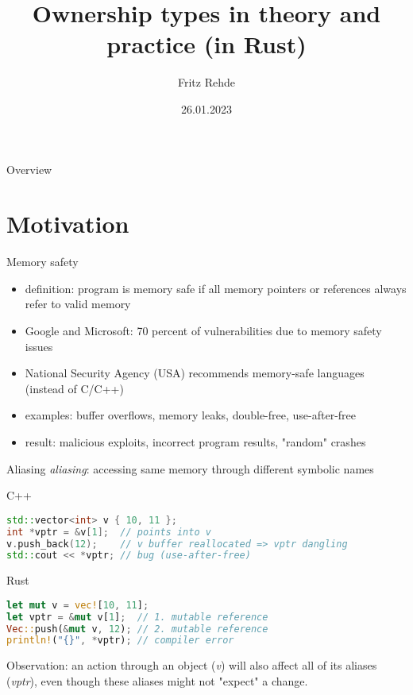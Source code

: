 \documentclass[handout]{beamer}
\title{Ownership types in theory and practice (in Rust)}
\author{Fritz Rehde}
\institute{School of Computation, Information, and Technology\\Technical University of Munich}
\date{26.01.2023}
\begin{document}
\frame{\titlepage}

\begin{frame}{Overview}
\tableofcontents
\end{frame}

\section{Motivation}

\begin{frame}{Memory safety}
\begin{itemize}
  \item definition: program is memory safe if all memory pointers or references always refer to valid memory
  \item Google and Microsoft: 70 percent of vulnerabilities due to memory safety issues
  \item National Security Agency (USA) recommends memory-safe languages (instead of C/C++)
  \item examples: buffer overflows, memory leaks, double-free, use-after-free
  \item result: malicious exploits, incorrect program results, "random" crashes
\end{itemize}
\end{frame}




\begin{frame}[fragile]{Aliasing}
\emph{aliasing}: accessing same memory through different symbolic names
\pause

C++
\begin{lstlisting}[language=C++]
std::vector<int> v { 10, 11 };
int *vptr = &v[1];  // points into v
v.push_back(12);    // v buffer reallocated => vptr dangling
std::cout << *vptr; // bug (use-after-free)
\end{lstlisting}
\pause


Rust
\begin{lstlisting}[language=Rust]
let mut v = vec![10, 11];
let vptr = &mut v[1];  // 1. mutable reference
Vec::push(&mut v, 12); // 2. mutable reference
println!("{}", *vptr); // compiler error
\end{lstlisting}

Observation: an action through an object (\emph{v}) will also affect all of its aliases (\emph{vptr}), even though these aliases might not "expect" a change.
\end{frame}
\end{document}
